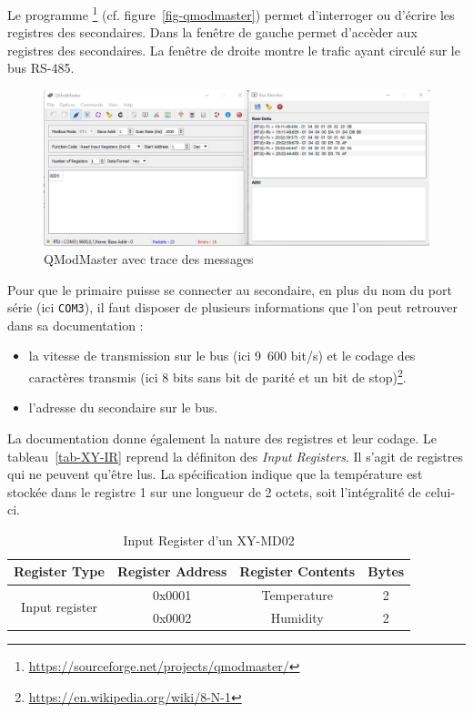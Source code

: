 Le programme \footnote{\url{https://sourceforge.net/projects/qmodmaster/}} (cf. figure~\vref{fig-qmodmaster}) permet d'interroger ou d'écrire les registres des secondaires. Dans la fenêtre de gauche permet d'accèder aux registres des secondaires. La fenêtre de droite montre le trafic ayant circulé sur le bus RS-485.

\begin{figure}[tbp]
\centerline{\includegraphics[width=1\columnwidth]{Pictures/modbus-trace.png}}
\caption{QModMaster avec trace des messages}
\label{fig-qmodmaster}
\end{figure}

Pour que le primaire puisse se connecter au secondaire, en plus du nom du port série (ici \texttt{COM3}), il faut disposer de plusieurs informations que l'on peut retrouver dans sa documentation :

\begin{itemize}
    \item la vitesse de transmission sur le bus (ici 9~600 bit/s) et le codage des caractères transmis (ici 8 bits sans bit de parité et un bit de stop)\footnote{\url{https://en.wikipedia.org/wiki/8-N-1}}.
    \item l'adresse du secondaire sur le bus.
\end{itemize}

    \vspace{1em}

La documentation donne également la nature des registres et leur codage. Le tableau~\vref{tab-XY-IR} reprend la définiton des \textit{Input Registers}. Il s'agit de registres qui ne peuvent qu'être lus. La spécification indique que la température est stockée dans le registre 1 sur une longueur de 2 octets, soit l'intégralité de celui-ci.

\begin{table}
\begin{center}
\begin{tabular}{|c|c|c|c|}
\hline
 \rowcolor{purple!10} Register Type & Register Address & Register Contents & Bytes \\ \hline \hline
 \multirow{2}{*}{Input register} & 0x0001 & Temperature & 2 \\ \cline{2-4}
                                 & 0x0002 & Humidity & 2 \\  \hline
\end{tabular}
\end{center}
\caption{Input Register d'un XY-MD02}
\label{tab-XY-IR}
\end{table}

